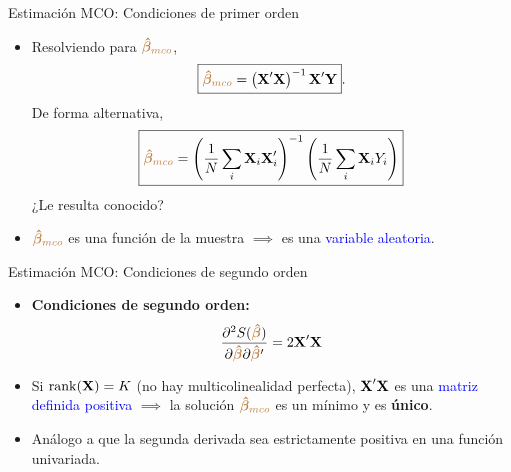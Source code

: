 \documentclass[9pt, xcolor=dvipsnames]{beamer}
\begin{document}
\begin{frame}{Estimación MCO: Condiciones de primer orden}
\begin{itemize}
    \item Resolviendo para $\textcolor{brown}{\boldsymbol{\hat{\beta}}_{mco}}$,	
    \begin{align*}
    \begin{split}
    	\boxed{\textcolor{brown}{\boldsymbol{\hat{\beta}}_{mco}} = \left(\textbf{X}' \textbf{X} \right)^{-1} \textbf{X}' \textbf{Y}}.
    \end{split}
    \end{align*}
	De forma alternativa, \vspace{-0.2cm}
		\begin{align*}
		\begin{split}
			\boxed{\textcolor{brown}{\boldsymbol{\hat{\beta}}_{mco}} = \left(\frac{1}{N}\sum_i \textbf{X}_i \textbf{X}'_i \right)^{-1} \left(\frac{1}{N} \sum_i  \textbf{X}_i Y_i\right)}
		\end{split}
		\end{align*}\vspace{0.0cm}
        ¿Le resulta conocido?
        \vspace{1.0em}
		\item $\textcolor{brown}{\boldsymbol{\hat{\beta}}_{mco}}$ es una función de la muestra $\implies$ es una \textcolor{blue}{variable aleatoria}. 
	\end{itemize}
\end{frame}


\begin{frame}{Estimación MCO: Condiciones de segundo orden}
\begin{itemize}
    \item[2.] \textbf{Condiciones de segundo orden:}
    \begin{align*}
    \begin{split}
        \frac{\partial^2 S(\textcolor{brown}{\boldsymbol{\hat{\beta}}})}{\partial \textcolor{brown}{\boldsymbol{\hat{\beta}}} \partial \textcolor{brown}{\boldsymbol{\hat{\beta}}}'} = 2 \textbf{X}' \textbf{X} 
    \end{split}
    \end{align*}	
    \item Si \(\mathrm{rank}(\textbf{X}) = K\) (no hay multicolinealidad perfecta), $\textbf{X}' \textbf{X}$ es una \textcolor{blue}{matriz definida positiva} $\implies$ la solución $\textcolor{brown}{\boldsymbol{\hat{\beta}}_{mco}}$ es un mínimo y es \textbf{único}. 
    \item Análogo a que la segunda derivada sea estrictamente positiva en una función univariada.  
\end{itemize}
\end{frame}
\end{document}
